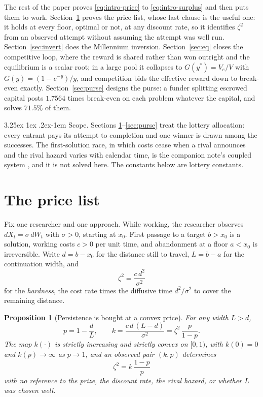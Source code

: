 \documentclass[11pt]{article}
\makeatletter
\renewcommand\paragraph{\@startsection{paragraph}{4}{\z@}%
  {3.25ex \@plus1ex \@minus.2ex}{-1em}%
  {\normalfont\normalsize\itshape}}
\theoremstyle{itheads}
\newtheorem{proposition}{Proposition}
\makeatother
\begin{document}
The rest of the paper proves \eqref{eq:intro-price} to
\eqref{eq:intro-surplus} and then puts them to work. Section~\ref{sec:price}
proves the price list, whose last clause is the useful one: it holds at
every floor, optimal or not, at any discount rate, so it identifies
$\zeta^{2}$ from an observed attempt without assuming the attempt was well
run. Section~\ref{sec:invert} does the Millennium inversion.
Section~\ref{sec:eq} closes the competitive loop, where the reward is shared
rather than won outright and the equilibrium is a scalar root; in a large
pool it collapses to $G(y^{*})=V_{e}/V$ with $G(y)=(1-e^{-y})/y$, and
competition bids the effective reward down to break-even exactly.
Section~\ref{sec:purse} designs the purse: a funder splitting escrowed
capital posts $1.7564$ times break-even on each problem whatever the
capital, and solves $71.5\%$ of them.

\paragraph{Scope.}
Sections \ref{sec:price}--\ref{sec:purse} treat the lottery allocation:
every entrant pays its attempt to completion and one winner is drawn among
the successes. The first-solution race, in which costs cease when a rival
announces and the rival hazard varies with calendar time, is the companion
note's coupled system \citep{cotton2026races}, and it is not solved here.
The constants below are lottery constants.


\section{The price list}
\label{sec:price}

Fix one researcher and one approach. While working, the researcher
observes $dX_{t}=\sigma\,dW_{t}$ with $\sigma>0$, starting at $x_{0}$.
First passage to a target $b>x_{0}$ is a solution, working costs $c>0$ per
unit time, and abandonment at a floor $a<x_{0}$ is irreversible. Write
$d=b-x_{0}$ for the distance still to travel, $L=b-a$ for the continuation
width, and
\begin{equation}
\zeta^{2}=\frac{c\,d^{2}}{\sigma^{2}}
\end{equation}
for the \emph{hardness}, the cost rate times the diffusive time
$d^{2}/\sigma^{2}$ to cover the remaining distance.

\begin{proposition}[Persistence is bought at a convex price]
\label{prop:price}
For any width $L>d$,
\begin{equation}
p=1-\frac{d}{L},
\qquad
k=\frac{c\,d\,(L-d)}{\sigma^{2}}=\zeta^{2}\,\frac{p}{1-p}.
\label{eq:price}
\end{equation}
The map $k(\cdot)$ is strictly increasing and strictly convex on $[0,1)$,
with $k(0)=0$ and $k(p)\to\infty$ as $p\to1$, and an observed pair
$(k,p)$ determines
\begin{equation}
\zeta^{2}=k\,\frac{1-p}{p}
\label{eq:identify}
\end{equation}
with no reference to the prize, the discount rate, the rival hazard, or
whether $L$ was chosen well.
\end{proposition}
\end{document}
